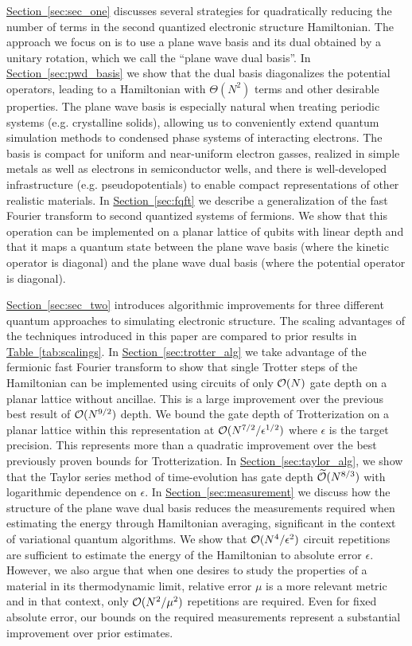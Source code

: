 \documentclass[superscriptaddress,aps,pra,nofootinbib,notitlepage,10pt,longbibliography]{revtex4-1}
\renewcommand{\sec}[1]{\hyperref[sec:#1]{Section~\ref*{sec:#1}}}
\newcommand{\tab}[1]{\hyperref[tab:#1]{Table~\ref*{tab:#1}}}
\begin{document}
\sec{sec_one} discusses several strategies for quadratically reducing the number of terms in the second quantized electronic structure Hamiltonian. The approach we focus on is to use a plane wave basis and its dual obtained by a unitary rotation, which we call the ``plane wave dual basis''. In \sec{pwd_basis} we show that the dual basis diagonalizes the potential  operators, leading to a Hamiltonian with $\Theta(N^2)$ terms and other desirable properties. The plane wave basis is especially natural when treating periodic systems (e.g. crystalline solids), allowing us to conveniently extend quantum simulation methods to condensed phase systems of interacting electrons. The basis is compact for uniform and near-uniform electron gasses, realized in simple metals as well as electrons in semiconductor wells, and there is well-developed infrastructure (e.g. pseudopotentials) to enable compact representations of other realistic materials. In \sec{fqft} we describe a generalization of the fast Fourier transform to second quantized systems of fermions. We show that this operation can be implemented on a planar lattice of qubits with linear depth and that it maps a quantum state between the plane wave basis (where the kinetic operator is diagonal) and the plane wave dual basis (where the  potential operator is diagonal).

\sec{sec_two} introduces algorithmic improvements for three different quantum approaches to simulating electronic structure. The scaling advantages of the techniques introduced in this paper are compared to prior results in \tab{scalings}. In \sec{trotter_alg} we take advantage of the fermionic fast Fourier transform to show that single Trotter steps of the Hamiltonian can be implemented using circuits of only ${\cal O}(N)$ gate depth on a planar lattice without ancillae. This is a large improvement over the previous best result of ${\cal O}(N^{9/2})$ depth. We bound the gate depth of Trotterization on a planar lattice within this representation at ${\cal O}(N^{7/2} / \epsilon^{1/2})$ where $\epsilon$ is the target precision. This represents more than a quadratic improvement over the best previously proven bounds for Trotterization. In \sec{taylor_alg}, we show that the Taylor series method of time-evolution has gate depth $\widetilde{\cal O}(N^{8/3})$ with logarithmic dependence on $\epsilon$. In \sec{measurement} we discuss how the structure of the plane wave dual basis reduces the measurements required when estimating the energy through Hamiltonian averaging, significant in the context of variational quantum algorithms. We show that ${\cal O}(N^{4} / \epsilon^2)$ circuit repetitions are sufficient to estimate the energy of the Hamiltonian to absolute error $\epsilon$. However, we also argue that when one desires to study the properties of a material in its thermodynamic limit, relative error $\mu$ is a more relevant metric and in that context, only  ${\cal O}(N^{2} / \mu^2)$ repetitions are required. Even for fixed absolute error, our bounds on the required measurements represent a substantial improvement over prior estimates.
\end{document}
